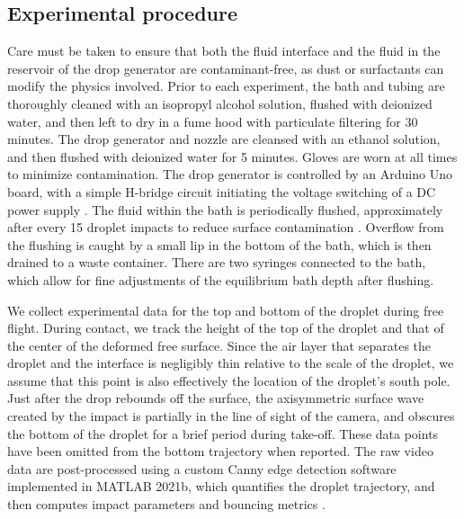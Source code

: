 \documentclass{jfm}
\begin{document}
\subsection{Experimental procedure}\label{Section:ExpProc}
Care must be taken to ensure that both the fluid interface and the fluid in the reservoir of the drop generator are contaminant-free, as dust or surfactants can modify the physics involved. Prior to each experiment, the bath and tubing are thoroughly cleaned with an isopropyl alcohol solution, flushed with deionized water, and then left to dry in a fume hood with particulate filtering for 30 minutes. The drop generator and nozzle are cleansed with an ethanol solution, and then flushed with deionized water for 5 minutes. Gloves are worn at all times to minimize contamination. The drop generator is controlled by an Arduino Uno board, with a simple H-bridge circuit initiating the voltage switching of a DC power supply \citep{ionkin2018note}. The fluid within the bath is periodically flushed, approximately after every 15 droplet impacts to reduce surface contamination \citep{kou2008method}. Overflow from the flushing is caught by a small lip in the bottom of the bath, which is then drained to a waste container. There are two syringes connected to the bath, which allow for fine adjustments of the equilibrium bath depth after flushing.

We collect experimental data for the top and bottom of the droplet during free flight. During contact, we track the height of the top of the droplet and that of the center of the deformed free surface. Since the air layer that separates the droplet and the interface is negligibly thin relative to the scale of the droplet, we assume that this point is also effectively the location of the droplet's south pole. Just after the drop rebounds off the surface, the axisymmetric surface wave created by the impact is partially in the line of sight of the camera, and obscures the bottom of the droplet for a brief period during take-off. These data points have been omitted from the bottom trajectory when reported. The raw video data are post-processed using a custom Canny edge detection software implemented in MATLAB 2021b, which quantifies the droplet trajectory, and then computes impact parameters and bouncing metrics \citep{galeano2021capillary}. 
\end{document}
